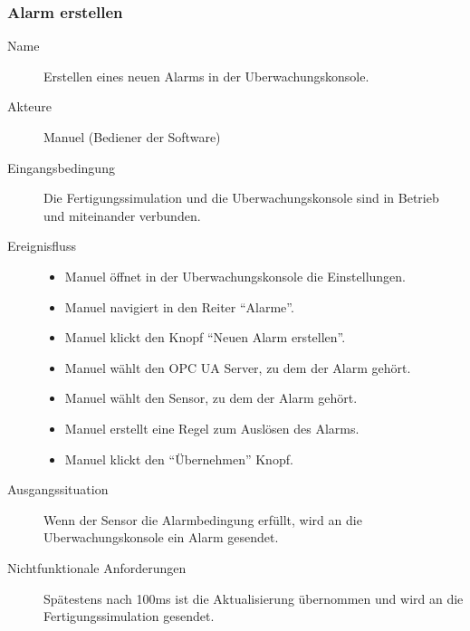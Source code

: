 \documentclass[parskip=full]{scrartcl}
\begin{document}
\subsubsection{Alarm erstellen}
\begin{description}
 \item[Name] Erstellen eines neuen Alarms in der \gls{Uberwachungskonsole}.
 \item[Akteure] Manuel (Bediener der Software)
 \item[Eingangsbedingung] Die \gls{Fertigungssimulation} und die \gls{Uberwachungskonsole} sind in Betrieb und miteinander verbunden.
 \item[Ereignisfluss]
 \begin{itemize}[noitemsep]
  \item Manuel \"offnet in der \gls{Uberwachungskonsole} die Einstellungen.
  \item Manuel navigiert in den Reiter ``Alarme''.
  \item Manuel klickt den Knopf ``Neuen Alarm erstellen''.
  \item Manuel w\"ahlt den \gls{OPC UA} Server, zu dem der Alarm geh\"ort.
  \item Manuel w\"ahlt den Sensor, zu dem der Alarm geh\"ort.
  \item Manuel erstellt eine Regel zum Ausl\"osen des Alarms.
  \item Manuel klickt den ``\"Ubernehmen'' Knopf.
 \end{itemize}
 \item[Ausgangssituation] Wenn der Sensor die Alarmbedingung erf\"ullt, wird an die \gls{Uberwachungskonsole} ein Alarm gesendet.
 \item [Nichtfunktionale Anforderungen] Sp\"atestens nach 100ms ist die Aktualisierung \"ubernommen und wird
  an die \gls{Fertigungssimulation} gesendet.
\end{description}
\end{document}
